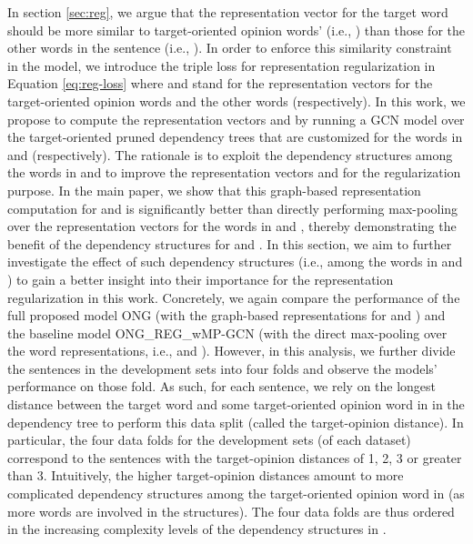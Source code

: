 \documentclass[11pt,a4paper]{article}
\begin{document}
In section \ref{sec:reg}, we argue that the representation vector for the target word should be more similar to target-oriented opinion words' (i.e., ) than those for the other words in the sentence (i.e., ). In order to enforce this similarity constraint in the model, we introduce the triple loss for representation regularization in Equation \ref{eq:reg-loss} where  and  stand for the representation vectors for the target-oriented opinion words  and the other words  (respectively). In this work, we propose to compute the representation vectors  and  by running a GCN model over the target-oriented pruned dependency trees that are customized for the words in  and  (respectively). The rationale is to exploit the dependency structures among the words in  and  to improve the representation vectors  and  for the regularization purpose. In the main paper, we show that this graph-based representation computation for  and  is significantly better than directly performing max-pooling over the representation vectors for the words in  and , thereby demonstrating the benefit of the dependency structures for  and . In this section, we aim to further investigate the effect of such dependency structures (i.e., among the words in  and ) to gain a better insight into their importance for the representation regularization in this work. Concretely, we again compare the performance of the full proposed model ONG (with the graph-based representations for  and ) and the baseline model ONG\_REG\_wMP-GCN (with the direct max-pooling over the word representations, i.e.,  and ). However, in this analysis, we further divide the sentences in the development sets into four folds and observe the models' performance on those fold. As such, for each sentence, we rely on the longest distance between the target word and some target-oriented opinion word in  in the dependency tree to perform this data split (called the target-opinion distance). In particular, the four data folds for the development sets (of each dataset) correspond to the sentences with the target-opinion distances of 1, 2, 3 or greater than 3. Intuitively, the higher target-opinion distances amount to more complicated dependency structures among the target-oriented opinion word in  (as more words are involved in the structures). The four data folds are thus ordered in the increasing complexity levels of the dependency structures in .
\end{document}
